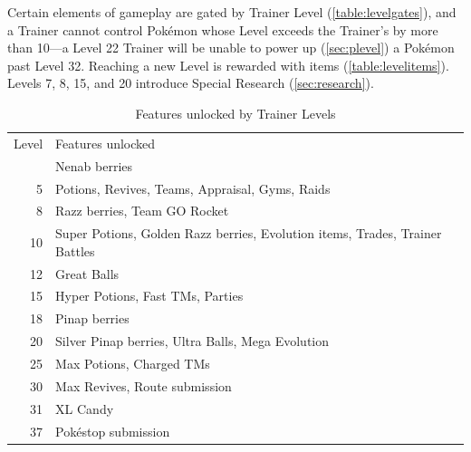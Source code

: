 Certain elements of gameplay are gated by Trainer Level (\autoref{table:levelgates}),
  and a Trainer cannot control Pokémon whose Level exceeds the Trainer's
  by more than 10---a Level 22 Trainer will be unable to power up (\autoref{sec:plevel}) a Pokémon past Level 32.
Reaching a new Level is rewarded with items (\autoref{table:levelitems}).
Levels 7, 8, 15, and 20 introduce Special Research (\autoref{sec:research}).
\begin{table}[ht]
\begin{center}
  \begin{tabular}{r p{}}
  Level & Features unlocked \\
\Midrule
  2 & Nenab berries \\
  5 & Potions, Revives, Teams, Appraisal, Gyms, Raids \\
  8 & Razz berries, Team GO Rocket \\
  10 & Super Potions, Golden Razz berries, Evolution items, Trades, Trainer Battles \\
  12 & Great Balls \\
  15 & Hyper Potions, Fast TMs, Parties \\
  18 & Pinap berries \\
  20 & Silver Pinap berries, Ultra Balls, Mega Evolution \\
  25 & Max Potions, Charged TMs \\
  30 & Max Revives, Route submission \\
  31 & XL Candy \\
  37 & Pokéstop submission \\
\end{tabular}
\caption{Features unlocked by Trainer Levels}
\label{table:levelgates}
\end{center}
\end{table}

